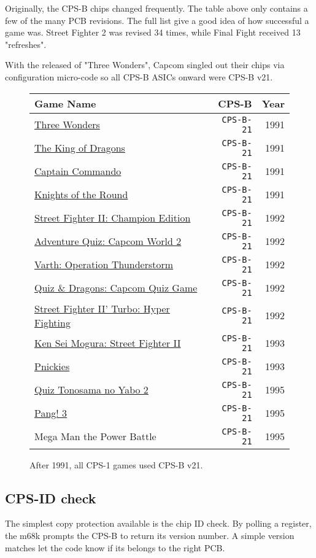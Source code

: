 Originally, the CPS-B chips changed frequently. The table above only contains a few of the many PCB revisions. The full list give a good idea of how successful a game was. Street Fighter 2 was revised 34 times, while Final Fight received 13 "refreshes".

With the released of "Three Wonders", Capcom singled out their chips via configuration micro-code so all CPS-B ASICs onward were CPS-B v21.

\begin{figure}[H]
{ \setlength{\tabcolsep}{3.0pt}
\begin{tabularx}{\textwidth}{Xrr} 
  \textbf{Game Name} & \textbf{ CPS-B }  & \textbf{ Year } \\               
  \toprule    
\href{}{Three Wonders} &  \texttt{CPS-B-21} & 1991 \\ 
\href{}{The King of Dragons} &  \texttt{CPS-B-21} &1991 \\ 
\href{}{Captain Commando} &  \texttt{CPS-B-21} & 1991 \\ 
\href{}{Knights of the Round} &  \texttt{CPS-B-21} &1991 \\ 
  \toprule    
\href{}{Street Fighter II: Champion Edition} &  \texttt{CPS-B-21} &1992 \\ 
\href{}{Adventure Quiz: Capcom World 2} &  \texttt{CPS-B-21} &1992 \\ 
\href{}{Varth: Operation Thunderstorm} &  \texttt{CPS-B-21} &1992 \\ 
\href{}{Quiz \& Dragons: Capcom Quiz Game} &  \texttt{CPS-B-21} &1992 \\ 
\href{}{Street Fighter II' Turbo: Hyper Fighting} &  \texttt{CPS-B-21} & 1992 \\ 
  \toprule    
\href{}{Ken Sei Mogura: Street Fighter II} &  \texttt{CPS-B-21} &1993 \\ 
\href{}{Pnickies} &  \texttt{CPS-B-21} &1993 \\ 
  \toprule    
\href{}{Quiz Tonosama no Yabo 2} &  \texttt{CPS-B-21} & 1995 \\ 
\href{}{Pang! 3} & \texttt{CPS-B-21}  & 1995 \\ 
Mega Man the Power Battle & \texttt{CPS-B-21}  & 1995 \\

\toprule    
\end{tabularx}%
}\caption*{After 1991, all CPS-1 games used CPS-B v21.}
\end{figure}


\subsection{CPS-ID check}
The simplest copy protection available is the chip ID check. By polling a register, the m68k prompts the CPS-B to return its version number. A simple version matches let the code know if its belongs to the right PCB. 

